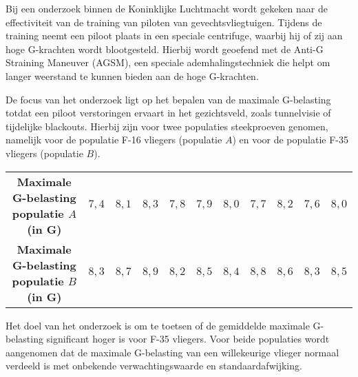 \begin{question}{28}{
    Bij een onderzoek binnen de Koninklijke Luchtmacht wordt gekeken naar de effectiviteit van de training van piloten van gevechtsvliegtuigen.
    Tijdens de training neemt een piloot plaats in een speciale centrifuge, waarbij hij of zij aan hoge G-krachten wordt blootgesteld.
    Hierbij wordt geoefend met de Anti-G Straining Maneuver (AGSM), een speciale ademhalingstechniek die helpt om langer weerstand te kunnen bieden aan de hoge G-krachten.

    De focus van het onderzoek ligt op het bepalen van de maximale G-belasting totdat een piloot verstoringen ervaart in het gezichtsveld, zoals tunnelvisie of tijdelijke blackouts.
    Hierbij zijn voor twee populaties steekproeven genomen, namelijk voor de populatie F-16 vliegers (populatie $A$) en voor de populatie F-35 vliegers (populatie $B$).

    \begin{center}
            \begin{tabular}{c|cccccccccc}
                \toprule
                    \textbf{Maximale G-belasting populatie $A$ (in G)} & $7,4$ & $8,1$ & $8,3$ & $7,8$ & $7,9$ & $8,0$ & $7,7$ & $8,2$ & $7,6$ & $8,0$ \\
                    \textbf{Maximale G-belasting populatie $B$ (in G)} & $8,3$ & $8,7$ & $8,9$ & $8,2$ & $8,5$ & $8,4$ & $8,8$ & $8,6$ & $8,3$ & $8,5$ \\
                \bottomrule
            \end{tabular}
        \end{center}

    Het doel van het onderzoek is om te toetsen of de gemiddelde maximale G-belasting significant hoger is voor F-35 vliegers. 
    Voor beide populaties wordt aangenomen dat de maximale G-belasting van een willekeurige vlieger normaal verdeeld is met onbekende verwachtingswaarde en standaardafwijking.
}
\end{question}
